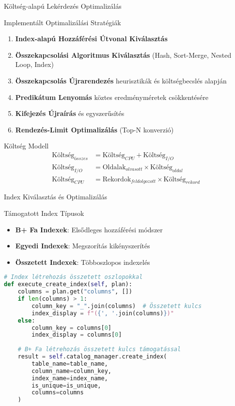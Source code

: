 \documentclass[aspectratio=169]{beamer}
\begin{document}
\begin{frame}{Költség-alapú Lekérdezés Optimalizálás}
\begin{block}{Implementált Optimalizálási Stratégiák}
\begin{enumerate}
    \item \textbf{Index-alapú Hozzáférési Útvonal Kiválasztás}
    \item \textbf{Összekapcsolási Algoritmus Kiválasztás} (Hash, Sort-Merge, Nested Loop, Index)
    \item \textbf{Összekapcsolás Újrarendezés} heurisztikák és költségbecslés alapján
    \item \textbf{Predikátum Lenyomás} köztes eredményméretek csökkentésére
    \item \textbf{Kifejezés Újraírás} és egyszerűsítés
    \item \textbf{Rendezés-Limit Optimalizálás} (Top-N konverzió)
\end{enumerate}
\end{block}

\begin{block}{Költség Modell}
\begin{align}
\text{Költség}_{összes} &= \text{Költség}_{CPU} + \text{Költség}_{I/O} \\
\text{Költség}_{I/O} &= \text{Oldalak}_{olvasott} \times \text{Költség}_{oldal} \\
\text{Költség}_{CPU} &= \text{Rekordok}_{feldolgozott} \times \text{Költség}_{rekord}
\end{align}
\end{block}
\end{frame}

\begin{frame}[fragile]{Index Kiválasztás és Optimalizálás}
\begin{block}{Támogatott Index Típusok}
\begin{itemize}
    \item \textbf{B+ Fa Indexek}: Elsődleges hozzáférési módszer
    \item \textbf{Egyedi Indexek}: Megszorítás kikényszerítés
    \item \textbf{Összetett Indexek}: Többoszlopos indexelés
\end{itemize}
\end{block}

\begin{lstlisting}[language=Python]
# Index létrehozás összetett oszlopokkal
def execute_create_index(self, plan):
    columns = plan.get("columns", [])
    if len(columns) > 1:
        column_key = "_".join(columns)  # Összetett kulcs
        index_display = f"({', '.join(columns)})"
    else:
        column_key = columns[0]
        index_display = columns[0]
        
    # B+ Fa létrehozás összetett kulcs támogatással
    result = self.catalog_manager.create_index(
        table_name=table_name,
        column_name=column_key,
        index_name=index_name,
        is_unique=is_unique,
        columns=columns
    )
\end{lstlisting}
\end{frame}
\end{document}
